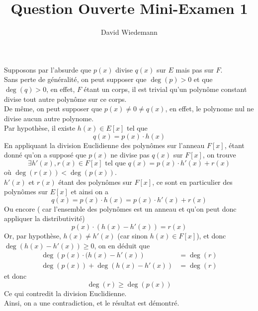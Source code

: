\documentclass[11pt, a4paper]{article}
\begin{document}
\title{Question Ouverte Mini-Examen 1}
\author{David Wiedemann}
\maketitle
Supposons par l'absurde que $p( x) $ divise $q( x) $ sur $E$ mais pas sur $F$.\\
Sans perte de généralité, on peut supposer que $\deg( p) >0$ et que $\deg ( q) >0$, en effet, $F$ étant un  corps, il est trivial qu'un polynôme constant divise tout autre polynôme sur ce corps.\\
De même, on peut supposer que $p( x) \neq 0 \neq q( x) $, en effet, le polynome nul ne divise aucun autre polynome.\\
Par hypothèse, il existe $h( x) \in E[x] $ tel que
\[ 
	q( x) = p( x)  \cdot h( x) 
\]
En appliquant la division Euclidienne des polynômes sur l'anneau $F[x]$, étant donné qu'on a supposé que  $p(x ) $ ne divise pas $q( x) $ sur $F[x]$, on trouve
\[ 
	\exists h'( x) , r( x)  \in F[x] \text{ tel que } q( x) = p( x) \cdot h'( x) + r( x) 
\]
où $\deg ( r( x) ) < \deg ( p( x) ) $.\\
$h'( x) $ et $r( x)$ étant des polynômes sur $F[x]$, ce sont en particulier des polynômes sur $E[x]$ et ainsi on a
\[ 
	q( x) = p( x) \cdot h( x) = p( x) \cdot h'( x) + r( x) 
\]
Ou encore ( car l'ensemble des polynômes est un anneau et qu'on peut donc appliquer la distributivité) 
\[ 
	p( x)  \cdot ( h( x) - h'( x) ) = r( x) 
\]
Or, par hypothèse, $h( x) \neq h'( x) $ (car sinon $h( x) \in F[x] $), et donc $\deg( h( x) - h'( x) ) \geq 0 $,  on en déduit que
\begin{align*}
	\deg \left( p( x) \cdot ( h( x) - h'( x)  \right) &= \deg ( r) \\
	\deg ( p( x)) +\deg   \left( h( x) - h'( x) \right)  &= \deg ( r) 
\end{align*}
et donc
\[ 
	\deg ( r) \geq \deg ( p( x) ) 
\]
Ce qui contredit la division Euclidienne.\\
Ainsi, on a une contradiction, et le résultat est démontré.
\end{document}
